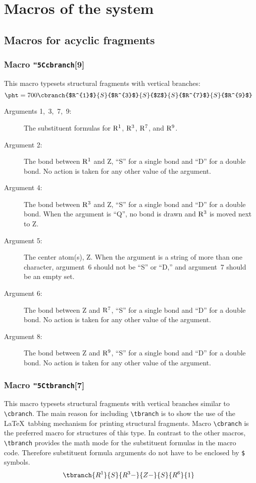 \section{Macros of the system}
\subsection{Macros for acyclic fragments}
\subsubsection{Macro {\tt\char"5C{}cbranch}[9]}
This macro
 typesets structural fragments with vertical branches:
$$\pht=700
 \cbranch{$R^{1}$}{S}{$R^{3}$}{S}{$Z$}{S}{$R^{7}$}{S}{$R^{9}$} $$
 
 \begin{description}
  \item[{\rm Arguments 1,~3,~7,~9:}] The substituent formulas for
                  ${\rm R^1}$, ${\rm R^3}$, ${\rm R^7}$, and
                  ${\rm R^9}$.
  \item[{\rm Argument 2:}] The bond between ${\rm R^1}$ and Z,
                  ``S'' for a single bond and ``D'' for a double
                  bond. No action is taken for any other value of
                  the argument.
  \item[{\rm Argument 4:}] The bond between ${\rm R^3}$ and Z,
                 ``S'' for a single bond and ``D'' for a double
                 bond. When the argument is ``Q'', no bond is
                 drawn and ${\rm R^3}$ is moved next to Z.
  \item[{\rm Argument 5:}] The center atom(s), Z. When the argument is
                 a string of more than one character, argument~6
                 should not be ``S'' or ``D,'' and argument~7
                 should be an empty set.
  \item[{\rm Argument 6:}] The bond between Z and ${\rm R^7}$,
                 ``S'' for a single bond and ``D'' for a double
                 bond. No action is taken for any other value
                 of the argument.
  \item[{\rm Argument 8:}] The bond between Z and ${\rm R^9}$,
                 ``S'' for a single bond and ``D'' for a double
                 bond. No action is taken for any other value
                 of the argument.
 \end{description}
 
\subsubsection{Macro {\tt\char"5C{}tbranch}[7]}
 This macro typesets structural fragments with vertical branches
 similar to \verb+\cbranch+. The main reason for including
 \verb+\tbranch+ is to show the use of the \LaTeX\  tabbing
 mechanism for printing structural fragments.
 Macro \verb+\cbranch+ is the preferred macro for structures
 of this type.  In contrast to the other macros, \verb+\tbranch+
 provides the math mode for the substituent formulas in the
 macro code. Therefore substituent formula arguments do not
 have to be enclosed by \verb-$- symbols.
 \[ \tbranch{R^1}{S}{R^3-}{Z-}{S}{R^6}{1}  \]
 
